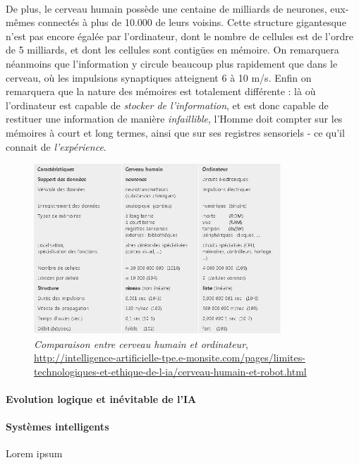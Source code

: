 \paragraph{} De plus, le cerveau humain possède une centaine de milliards de neurones, eux-mêmes connectés à plus de 10.000
de leurs voisins. Cette structure gigantesque n'est pas encore égalée par l'ordinateur, dont le nombre de cellules est de
l'ordre de 5 milliards, et dont les cellules sont contigües en mémoire. On remarquera néanmoins que l'information y circule
beaucoup plus rapidement que dans le cerveau, où les impulsions synaptiques atteignent 6 à 10 m/s. Enfin on remarquera que la
nature des mémoires est totalement différente : là où l'ordinateur est capable de \emph{stocker de l'information}, et est donc
capable de restituer une information de manière \emph{infaillible}, l'Homme doit compter sur les mémoires à court et long termes,
ainsi que sur ses registres sensoriels - ce qu'il connait de \emph{l'expérience}. \cite{Internet4}

\begin{figure}[h]
    \centering
    \includegraphics[width=350px]{chapters/03/images/cerveau-robot.jpg}
    \caption{\label{comparatif} \emph{Comparaison entre cerveau humain et ordinateur}, \url{http://intelligence-artificielle-tpe.e-monsite.com/pages/limites-technologiques-et-ethique-de-l-ia/cerveau-humain-et-robot.html}}
\end{figure}

\paragraph{Evolution logique et inévitable de l'IA} 

\paragraph{Systèmes intelligents} Lorem ipsum
